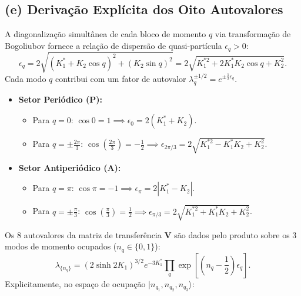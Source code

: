 \documentclass[11pt,a4paper]{article}
\begin{document}
\subsection*{(e) Derivação Explícita dos Oito Autovalores}
%
A diagonalização simultânea de cada bloco de momento $q$ via transformação de Bogoliubov fornece a relação de dispersão de quasi-partícula $\epsilon_q > 0$:
%
\begin{equation}
    \epsilon_q = 2\sqrt{(K_1^* + K_2 \cos q)^2 + (K_2 \sin q)^2} = 2\sqrt{K_1^{*2} + 2K_1^* K_2 \cos q + K_2^2}.
\end{equation}
%
Cada modo $q$ contribui com um fator de autovalor $\lambda_q^{\pm 1/2} = e^{\pm \frac{1}{2}\epsilon_q}$.
%
\begin{itemize}
    \item \textbf{Setor Periódico (P):}
    \begin{itemize}
        \item Para $q = 0$: $\cos 0 = 1 \implies \epsilon_0 = 2(K_1^* + K_2)$.
        \item Para $q = \pm \frac{2\pi}{3}$: $\cos\left(\frac{2\pi}{3}\right) = -\frac{1}{2} \implies \epsilon_{2\pi/3} = 2\sqrt{K_1^{*2} - K_1^* K_2 + K_2^2}$.
    \end{itemize}

    \item \textbf{Setor Antiperiódico (A):}
    \begin{itemize}
        \item Para $q = \pi$: $\cos\pi = -1 \implies \epsilon_\pi = 2|K_1^* - K_2|$.
        \item Para $q = \pm \frac{\pi}{3}$: $\cos\left(\frac{\pi}{3}\right) = \frac{1}{2} \implies \epsilon_{\pi/3} = 2\sqrt{K_1^{*2} + K_1^* K_2 + K_2^2}$.
    \end{itemize}
\end{itemize}
%
Os 8 autovalores da matriz de transferência $\mathbf{V}$ são dados pelo produto sobre os 3 modos de momento ocupados ($n_q \in \{0, 1\}$):
%
\begin{equation}
    \boxed{\lambda_{\{n_q\}} = (2\sinh 2K_1)^{3/2} e^{-3K_1^*} \prod_{q} \exp\left[ \left(n_q - \frac{1}{2}\right) \epsilon_q \right].}
\end{equation}
%
Explicitamente, no espaço de ocupação $|n_{q_1}, n_{q_2}, n_{q_3}\rangle$:
%
\end{document}
